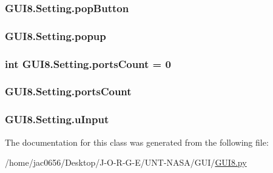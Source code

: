 \subsubsection[{\texorpdfstring{pop\+Button}{popButton}}]{\setlength{\rightskip}{0pt plus 5cm}G\+U\+I8.\+Setting.\+pop\+Button}\hypertarget{classGUI8_1_1Setting_acc73ea40eec7a5df29c126a05ea50469}{}\label{classGUI8_1_1Setting_acc73ea40eec7a5df29c126a05ea50469}
\subsubsection[{\texorpdfstring{popup}{popup}}]{\setlength{\rightskip}{0pt plus 5cm}G\+U\+I8.\+Setting.\+popup}\hypertarget{classGUI8_1_1Setting_af92ec45f76ce50d80dd6c79212a7a4c0}{}\label{classGUI8_1_1Setting_af92ec45f76ce50d80dd6c79212a7a4c0}
\subsubsection[{\texorpdfstring{ports\+Count}{portsCount}}]{\setlength{\rightskip}{0pt plus 5cm}int G\+U\+I8.\+Setting.\+ports\+Count = 0\hspace{0.3cm}{\ttfamily [static]}}\hypertarget{classGUI8_1_1Setting_a44d535d99519430baf5e908b6112911f}{}\label{classGUI8_1_1Setting_a44d535d99519430baf5e908b6112911f}
\subsubsection[{\texorpdfstring{ports\+Count}{portsCount}}]{\setlength{\rightskip}{0pt plus 5cm}G\+U\+I8.\+Setting.\+ports\+Count}\hypertarget{classGUI8_1_1Setting_a4852358f903995dedbb40d738957f40e}{}\label{classGUI8_1_1Setting_a4852358f903995dedbb40d738957f40e}
\subsubsection[{\texorpdfstring{u\+Input}{uInput}}]{\setlength{\rightskip}{0pt plus 5cm}G\+U\+I8.\+Setting.\+u\+Input}\hypertarget{classGUI8_1_1Setting_aaae8736d5ba95fca6d8e95d44cb1370c}{}\label{classGUI8_1_1Setting_aaae8736d5ba95fca6d8e95d44cb1370c}


The documentation for this class was generated from the following file\+:\begin{DoxyCompactItemize}
\item 
/home/jac0656/\+Desktop/\+J-\/\+O-\/\+R-\/\+G-\/\+E/\+U\+N\+T-\/\+N\+A\+S\+A/\+G\+U\+I/\hyperlink{GUI8_8py}{G\+U\+I8.\+py}\end{DoxyCompactItemize}
